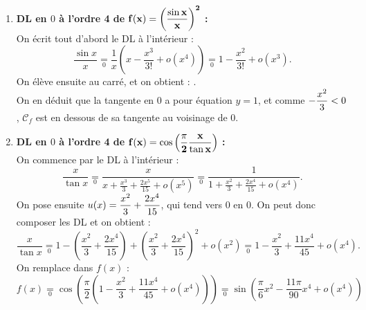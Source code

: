 \documentclass[a4paper, 11pt,reqno]{article}
\begin{document}
\begin{correction}
\begin{enumerate}
		      $$\frac{1}{x^2+x+2} = \frac{1}{2\left(1+\frac{x}{2}+ \frac{x^2}{2}\right)} = \frac{1}{2}\times  \frac{1}{1+\frac{x}{2}+ \frac{x^2}{2}}.$$
		      On pose $u(x) = \ddp  \frac{x}{2}+ \frac{x^2}{2}$, et on a bien $\lim\limits_{x \to 0} u(x) = 0$, on peut composer les DL :
		      $$\frac{1}{x^2+x+2}\underset{0}{=} \frac{1}{2}\left( 1- \left(\frac{x}{2}+ \frac{x^2}{2}\right) + \left(\frac{x}{2}+ \frac{x^2}{2}\right)^2 - \left(\frac{x}{2}+ \frac{x^2}{2}\right)^3 + o(x^3) \right).$$
		      En d\'eveloppant, puis en multipliant par $1+x$, on obtient : .\\
		      On en d\'eduit que la tangente en $0$ a pour \'equation $y=\ddp\frac{1}{2}+\ddp\frac{x}{2}$, et comme $-\ddp\frac{3x^2}{8}<0$, $\mathcal{C}_f$ est en dessous de sa tangente au voisinage de $0$.
		\item \textbf{DL en $0$ \`a l'ordre 4 de $\mathbf{f(x)=\left(\displaystyle\frac{\sin{x}}{x}  \right)^2}$ :}\\
		      On \'ecrit tout d'abord le DL \`a l'int\'erieur :
		      $$\frac{\sin x}{x} \underset{0}{=} \frac{1}{x}\left(x- \frac{x^3}{3!} + o(x^4) \right) \underset{0}{=} 1 - \frac{x^2}{3!} + o(x^3).$$
		      On \'el\`eve ensuite au carr\'e, et on obtient :
		      .\\
		      On en d\'eduit que la tangente en $0$ a pour \'equation $y=1$, et comme $-\displaystyle\frac{x^2}{3}<0$, $\mathcal{C}_f$ est en dessous de sa tangente au voisinage de $0$.
		\item \textbf{DL en $0$ \`a l'ordre 4 de $\mathbf{f(x)=\cos{\left( \displaystyle\frac{\pi}{2}\displaystyle\frac{x}{\tan{x}} \right)}}$ :}\\
		      On commence par le DL \`a l'int\'erieur :
		      $$\frac{x}{\tan x} \underset{0}{=} \frac{x}{x+\frac{x^3}{3} + \frac{2x^5}{15} + o(x^5)} \underset{0}{=} \frac{1}{1+\frac{x^2}{3}+\frac{2x^4}{15}+o(x^4)}.$$
		      On pose ensuite $u(x) = \displaystyle \frac{x^2}{3}+\frac{2x^4}{15}$, qui tend vers $0$ en $0$. On peut donc composer les DL et on obtient :
		      $$\frac{x}{\tan x} \underset{0}{=} 1 - \left(\frac{x^2}{3}+\frac{2x^4}{15}\right) +  \left(\frac{x^2}{3}+\frac{2x^4}{15}\right)^2 + o(x^2)  \underset{0}{=} 1 - \frac{x^2}{3} + \frac{11x^4}{45}+o(x^4).$$
		      On remplace dans $f(x)$ :
		      $$f(x) \underset{0}{=} \cos\left(\frac{\pi}{2} \left(  1 - \frac{x^2}{3} + \frac{11x^4}{45}+o(x^4)\right) \right) \underset{0}{=} \sin \left(\frac{\pi}{6}x^2 - \frac{11\pi}{90}x^4 + o(x^4)\right)$$

\end{enumerate}
\end{correction}
\end{document}
